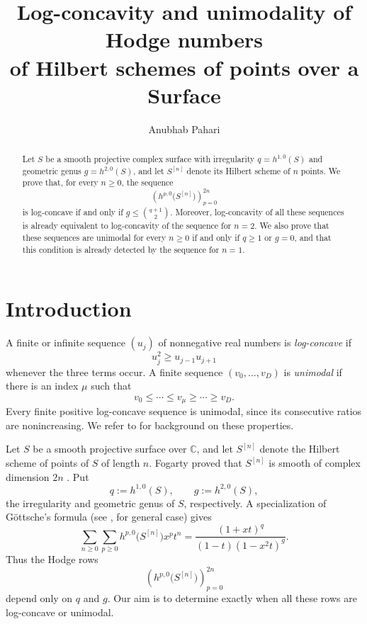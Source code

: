 \documentclass[12pt]{amsart}
\title[Log-concavity and unimodality for Hilbert schemes of points]
      {Log-concavity and unimodality of Hodge numbers\\
       of Hilbert schemes of points over a Surface}
\author{Anubhab Pahari}
\theoremstyle{plain}
\theoremstyle{definition}
\theoremstyle{remark}
\begin{document}
\begin{abstract}
Let \(S\) be a smooth projective complex surface with irregularity
\(q=h^{1,0}(S)\) and geometric genus \(g=h^{2,0}(S)\), and let
\(S^{[n]}\) denote its Hilbert scheme of \(n\) points.  We prove that,
for every \(n\ge0\), the sequence
\[
\left(h^{p,0}\bigl(S^{[n]}\bigr)\right)_{p=0}^{2n}
\]
is log-concave if and only if
\(g\le\binom{q+1}{2}\).  Moreover, log-concavity of all these sequences
is already equivalent to log-concavity of the sequence for \(n=2\).
We also prove that these sequences are unimodal for every \(n\ge0\) if
and only if \(q\ge1\) or \(g=0\), and that this condition is already
detected by the sequence for \(n=1\).
\end{abstract}
\maketitle

\section{Introduction}\label{sec:introduction}

A finite or infinite sequence \((u_j)\) of nonnegative real numbers is
\emph{log-concave} if
\[
 u_j^2\ge u_{j-1}u_{j+1}
\]
whenever the three terms occur.  A finite sequence
\((v_0,\ldots,v_D)\) is \emph{unimodal} if there is an index \(\mu\)
such that
\[
 v_0\le\cdots\le v_\mu\ge\cdots\ge v_D.
\]
Every finite positive log-concave sequence is unimodal, since its
consecutive ratios are nonincreasing.  We refer to
\cite{Stanley,Brenti} for
background on these properties.

Let \(S\) be a smooth projective surface over \(\mathbb C\), and let
\(S^{[n]}\) denote the Hilbert scheme of points of \(S\) of length
\(n\).  Fogarty proved that \(S^{[n]}\) is smooth of complex dimension
\(2n\) \cite[Theorem~2.4]{Fogarty}.  Put
\[
 q:=h^{1,0}(S),
 \qquad
 g:=h^{2,0}(S),
\]
the irregularity and geometric genus of \(S\), respectively.  A
specialization of G\"ottsche's formula
\cite[Proposition~3.3(a)]{Gottsche}(see \cite{GottscheSoergel}, for general case) gives
\[
 \sum_{n\ge0}\sum_{p\ge0}
 h^{p,0}\bigl(S^{[n]}\bigr)x^pt^n
 =
 \frac{(1+xt)^q}{(1-t)(1-x^2t)^g}.
\]
Thus the Hodge rows
\[
 \left(h^{p,0}\bigl(S^{[n]}\bigr)\right)_{p=0}^{2n}
\]
depend only on \(q\) and \(g\).  Our aim is to determine exactly when
all these rows are log-concave or unimodal.
\end{document}
